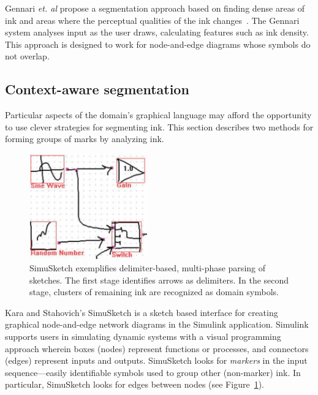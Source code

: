 Gennari \textit{et. al} propose a segmentation approach based on
finding dense areas of ink and areas where the perceptual qualities of
the ink changes~\cite{gennari-parsing}. The Gennari system analyses
input as the user draws, calculating features such as ink
density. This approach is designed to work for node-and-edge diagrams
whose symbols do not overlap.

\subsection{Context-aware segmentation}

Particular aspects of the domain's graphical language may afford the
opportunity to use clever strategies for segmenting ink. This section
describes two methods for forming groups of marks by analyzing ink.

\begin{figure}
\begin{center}
  \includegraphics[angle=0, origin=c, width=2in]{img/simusketch.pdf}

  \caption{SimuSketch exemplifies delimiter-based, multi-phase parsing
  of sketches. The first stage identifies arrows as delimiters. In the
  second stage, clusters of remaining ink are recognized as domain
  symbols. }

  \label{fig:simusketch}
\end{center}
\end{figure}

Kara and Stahovich's SimuSketch is a sketch based interface for
creating graphical node-and-edge network diagrams in the Simulink
application. Simulink supports users in simulating dynamic systems
with a visual programming approach wherein boxes (nodes) represent
functions or processes, and connectors (edges) represent inputs and
outputs. SimuSketch looks for
\textit{markers} in the input sequence---easily identifiable 
symbols used to group other (non-marker) ink. In particular,
SimuSketch looks for edges between nodes (see
Figure~\ref{fig:simusketch}). 

